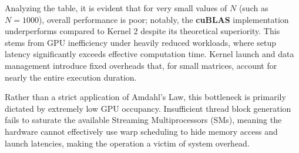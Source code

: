 \begin{table}[H]
\centering
{}
\end{table}

Analyzing the table, it is evident that for very small values of $N$ (such as $N = 1000$), overall performance is poor; notably, the \textbf{cuBLAS} implementation underperforms compared to Kernel 2 despite its theoretical superiority. 
This stems from GPU inefficiency under heavily reduced workloads, where setup latency significantly exceeds effective computation time. Kernel launch and data management introduce fixed overheads that, for small matrices, account for nearly the entire execution duration. 

Rather than a strict application of Amdahl's Law, this bottleneck is primarily dictated by extremely low GPU occupancy. Insufficient thread block generation fails to saturate the available Streaming Multiprocessors (SMs), meaning the hardware cannot effectively use warp scheduling to hide memory access and launch latencies, making the operation a victim of system overhead.


